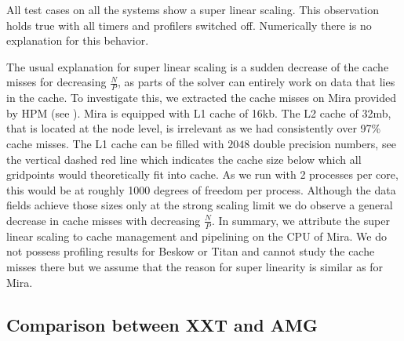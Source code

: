 \documentclass{sig-alternate}
\begin{document}
All test cases on all the systems show a super linear scaling. This
observation holds true with all timers and profilers switched off.
Numerically there is no explanation for this behavior. 

The usual explanation for super linear scaling is a sudden decrease of the cache
misses for decreasing $\frac{N}{P}$, as parts of the solver can entirely work on
data that lies in the cache. 
To investigate this, we extracted the cache misses on Mira provided by HPM (see
). Mira is equipped with L1 cache of 16kb. The L2 cache
of 32mb, that is located at the node level, is irrelevant as we had consistently
over 97\% cache misses. The L1 cache can be filled with $2048$ double precision
numbers, see
 the vertical dashed red line which indicates the cache 
size below which all gridpoints would theoretically fit into cache. As we run with 2 processes per core, this would be at roughly 1000
degrees of freedom per process. Although the data fields achieve those sizes only at the strong scaling
limit we do observe a general decrease in cache misses with decreasing
$\frac{N}{P}$. In summary, we attribute the super linear scaling to cache
management and pipelining on the CPU of Mira. We do not possess profiling results 
for Beskow or Titan and cannot study the cache misses there but we assume that the 
reason for super linearity is similar as for Mira.


\subsection{Comparison between XXT and AMG}
\end{document}
